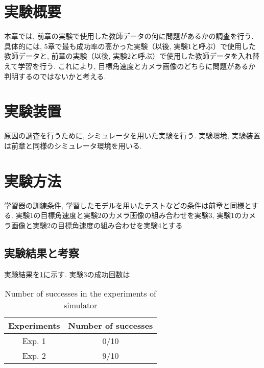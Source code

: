 
\section{実験概要}
本章では, 前章の実験で使用した教師データの何に問題があるかの調査を行う. 具体的には, 5章で最も成功率の高かった実験（以後, 実験1と呼ぶ）で使用した教師データと, 前章の実験（以後, 実験2と呼ぶ）で使用した教師データを入れ替えて学習を行う. これにより, 目標角速度とカメラ画像のどちらに問題があるか判明するのではないかと考える. 

\section{実験装置}
原因の調査を行うために, シミュレータを用いた実験を行う. 実験環境, 実験装置は前章と同様のシミュレータ環境を用いる. 

\section{実験方法}
学習器の訓練条件, 学習したモデルを用いたテストなどの条件は前章と同様とする. 実験1の目標角速度と実験2のカメラ画像の組み合わせを実験3, 実験1のカメラ画像と実験2の目標角速度の組み合わせを実験4とする

\subsection{実験結果と考察}
実験結果を\ref{tb:inves}に示す. 実験3の成功回数は

\begin{table}[h]
  \centering
  \caption{Number of successes in the experiments of simulator}
  \begin{tabular}{|c|c|} \hline
      Experiments & Number of successes \\ \hline
      Exp. 1 & 0/10 \\ \hline
      Exp. 2 & 9/10 \\ \hline
    \end{tabular}
  \label{tb:inves}
\end{table}



